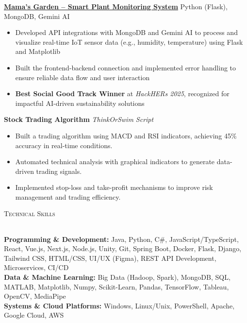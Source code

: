 \documentclass[a4paper]{article}
\newcommand{\lineunder} {
    \vspace*{-8pt} \\
    \hspace*{-18pt} \hrulefill \\
}
\newcommand{\header} [1] {
    {\hspace*{-18pt}\vspace*{6pt} \textsc{#1}}
    \vspace*{-6pt} \lineunder
}
\begin{document}
\textbf{\href{https://devpost.com/software/mama-s-garden}{Mama's Garden – Smart Plant Monitoring System}} \hfill Python (Flask), MongoDB, Gemini AI  
\vspace{-3mm}
\begin{itemize} \itemsep -4pt
    \item Developed API integrations with MongoDB and Gemini AI to process and visualize real-time IoT sensor data (e.g., humidity, temperature) using Flask and Matplotlib
    \item Built the frontend-backend connection and implemented error handling to ensure reliable data flow and user interaction
    \item \textbf{Best Social Good Track Winner} at \textit{HackHERs 2025}, recognized for impactful AI-driven sustainability solutions
\end{itemize}
\vspace{-1mm}

\textbf{{Stock Trading Algorithm}}  \hfill \textit{ThinkOrSwim Script} \\
\vspace{-3mm}
\begin{itemize} \itemsep -4pt
  \item Built a trading algorithm using MACD and RSI indicators, achieving 45\% accuracy in real-time conditions.
  \item Automated technical analysis with graphical indicators to generate data-driven trading signals.
  \item Implemented stop-loss and take-profit mechanisms to improve risk management and trading efficiency.
\end{itemize}
\vspace{-2mm}

%
%
\header{Technical Skills}
\vspace{0mm}

\textbf{Programming \& Development:} 
{\small
Java, Python, C\#, JavaScript/TypeScript, React, Vue.js, Next.js, Node.js, Unity, Git, Spring Boot, Docker, Flask, Django, Tailwind CSS, HTML/CSS, UI/UX (Figma), REST API Development, Microservices, CI/CD\\
}
\textbf{Data \& Machine Learning:} 
{\small
Big Data (Hadoop, Spark), MongoDB, SQL, MATLAB, Matplotlib, Numpy, Scikit-Learn, Pandas, TensorFlow, Tableau, OpenCV, MediaPipe\\
}
\textbf{Systems \& Cloud Platforms:} 
{\small
Windows, Linux/Unix, PowerShell, Apache, Google Cloud, AWS
}
\end{document}
